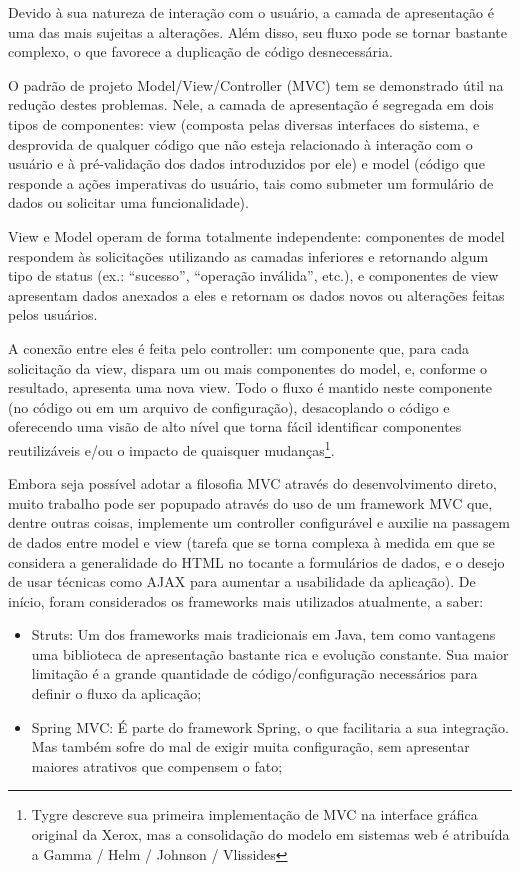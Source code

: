 \documentclass{abnt}
\begin{document}
Devido à sua natureza de interação com o usuário, a camada de apresentação é uma das mais sujeitas a alterações. Além disso, seu fluxo pode se tornar bastante complexo, o que favorece a duplicação de código desnecessária.

O padrão de projeto Model/View/Controller (MVC) tem se demonstrado útil na redução destes problemas. Nele, a camada de apresentação é segregada em dois tipos de componentes: view (composta pelas diversas interfaces do sistema, e desprovida de qualquer código que não esteja relacionado à interação com o usuário e à pré-validação dos dados introduzidos por ele) e model (código que responde a ações imperativas do usuário, tais como submeter um formulário de dados ou solicitar uma funcionalidade).

View e Model operam de forma totalmente independente: componentes de model respondem às solicitações utilizando as camadas inferiores e retornando algum tipo de status (ex.: “sucesso”, “operação inválida”, etc.), e componentes de view apresentam dados anexados a eles e retornam os dados novos ou alterações feitas pelos usuários.

A conexão entre eles é feita pelo controller: um componente que, para cada solicitação da view, dispara um ou mais componentes do model, e, conforme o resultado, apresenta uma nova view. Todo o fluxo é mantido neste componente (no código ou em um arquivo de configuração), desacoplando o código e oferecendo uma visão de alto nível que torna fácil identificar componentes reutilizáveis e/ou o impacto de quaisquer mudanças\footnote{Tygre descreve sua primeira implementação de MVC na interface gráfica original da Xerox, mas a consolidação do modelo em sistemas web é atribuída a Gamma / Helm / Johnson / Vlissides\cite{Gamma1995}}.

Embora seja possível adotar a filosofia MVC através do desenvolvimento direto, muito trabalho pode ser popupado através do uso de um framework MVC que, dentre outras coisas, implemente um controller configurável e auxilie na passagem de dados entre model e view (tarefa que se torna complexa à medida em que se considera a generalidade do HTML no tocante a formulários de dados, e o desejo de usar técnicas como AJAX para aumentar a usabilidade da aplicação). De início, foram considerados os frameworks mais utilizados atualmente, a saber:

\begin{itemize}
\item Struts: Um dos frameworks mais tradicionais em Java, tem como vantagens uma biblioteca de apresentação bastante rica e evolução constante. Sua maior limitação é a grande quantidade de código/configuração necessários para definir o fluxo da aplicação;
\item Spring MVC: É parte do framework Spring, o que facilitaria a sua integração. Mas também sofre do mal de exigir muita configuração, sem apresentar maiores atrativos que compensem o fato;
\end{itemize}
\end{document}
